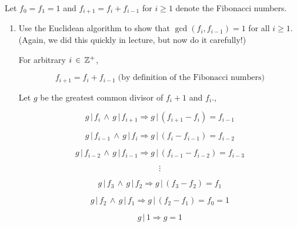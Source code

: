 \begin{problem}
Let $f_0=f_1=1$ and $f_{i+1}=f_i+f_{i-1}$ for $i \geq 1$ denote the Fibonacci numbers.  
\begin{enumerate}\renewcommand{\itemsep}{3mm}
\item Use the Euclidean algorithm to show that $\gcd(f_i,f_{i-1})=1$
for all $i \geq 1$. (Again, we did this quickly in lecture, but now do
it carefully!)

\begin{Answer}
\setcounter{equation}{0}
For arbitrary $i\,\in\,\mathbb{Z}^+$,

\begin{equation}
  f_{i+1} = f_{i} + f_{i-1} \; \text{(by definition of the Fibonacci numbers)}
\end{equation}

Let $g$ be the greatest common divisor of $f_{i}+1$ and $f_{i}$.,

\begin{equation}
  g\, |\, f_{i}\, \land\, g\, |\, f_{i+1} \Rightarrow g\, |\, (f_{i+1} - f_{i}) = f_{i-1}
\end{equation}

\begin{equation}
  g\, |\, f_{i-1}\, \land\, g\, |\, f_{i} \Rightarrow g\, |\, (f_{i} - f_{i-1}) = f_{i-2}
\end{equation}

\begin{equation}
  g\, |\, f_{i-2}\, \land\, g\, |\, f_{i-1} \Rightarrow g\, |\, (f_{i-1} - f_{i-2}) = f_{i-3}
\end{equation}

\begin{equation*}
\vdots
\end{equation*}

\begin{equation}
  g\, |\, f_{3}\, \land\, g\, |\, f_{2} \Rightarrow g\, |\, (f_{3} - f_{2}) = f_{1}
\end{equation}

\begin{equation}
  g\, |\, f_{2}\, \land\, g\, |\, f_{1} \Rightarrow g\, |\, (f_{2} - f_{1}) = f_{0} = 1
\end{equation}

\begin{equation}
  g \, |\, 1 \Rightarrow g = 1
\end{equation}

\end{Answer}


\end{enumerate}
\end{problem}
